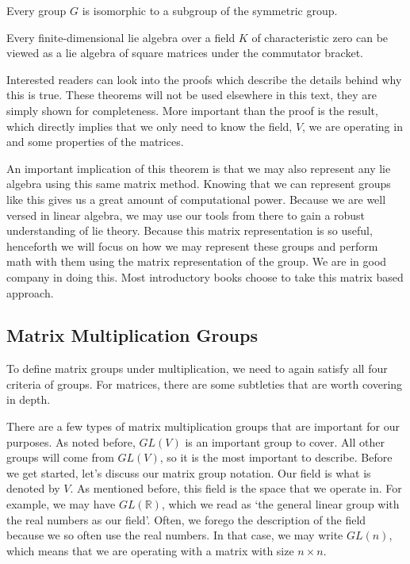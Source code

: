 \begin{theorem}\label{thm:cayley}
    Every group $G$ is isomorphic to a subgroup of the symmetric group.
\end{theorem}
\begin{theorem}\label{thm:Ado}
    Every finite-dimensional \gls{lie algebra} over a field $K$ of characteristic zero can be viewed as a \gls{lie algebra} of square matrices under the commutator bracket.
\end{theorem}

Interested readers can look into the proofs which describe the details behind why this is true. These theorems will not be used elsewhere in this text, they are simply shown for completeness. More important than the proof is the result, which directly implies that we only need to know the field, $V$, we are operating in and some properties of the matrices.

An important implication of this theorem is that we may also represent any \gls{lie algebra} using this same matrix method. Knowing that we can represent groups like this gives us a great amount of computational power. Because we are well versed in linear algebra, we may use our tools from there to gain a robust understanding of \gls{lie theory}. Because this matrix representation is so useful, henceforth we will focus on how we may represent these groups and perform math with them using the matrix representation of the group. We are in good company in doing this. Most introductory books choose to take this matrix based approach.

\subsection{Matrix Multiplication Groups}\label{sec:matrix groups}
To define matrix groups under multiplication, we need to again satisfy all four criteria of groups. For matrices, there are some subtleties that are worth covering in depth.

    There are a few types of matrix multiplication groups that are important for our purposes. As noted before, $GL(V)$ is an important group to cover. All other groups will come from $GL(V)$, so it is the most important to describe. Before we get started, let's discuss our matrix group notation. Our field is what is denoted by $V$. As mentioned before, this field is the space that we operate in. For example, we may have $GL(\mathbb{R})$, which we read as `the general linear group with the real numbers as our field'. Often, we forego the description of the field because we so often use the real numbers. In that case, we may write $GL(n)$, which means that we are operating with a matrix with size $n\times n$.

